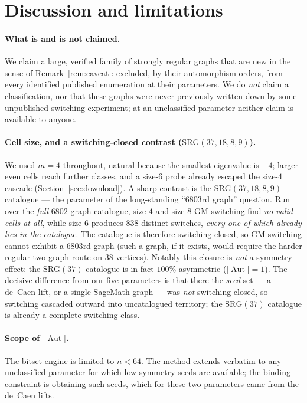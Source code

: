 \documentclass[11pt]{article}
\theoremstyle{definition}
\newcommand{\SRG}[1]{\mathrm{SRG}(#1)}
\newcommand{\Aut}{\operatorname{Aut}}
\begin{document}
\section{Discussion and limitations}\label{sec:discussion}

\paragraph{What is and is not claimed.} We claim a large, verified family of strongly
regular graphs that are new in the sense of Remark~\ref{rem:caveat}: excluded, by their
automorphism orders, from every identified published enumeration at their parameters. We do
\emph{not} claim a classification, nor that these graphs were never previously written
down by some unpublished switching experiment; at an unclassified parameter neither claim
is available to anyone.

\paragraph{Cell size, and a switching-closed contrast ($\SRG{37,18,8,9}$).} We used $m=4$
throughout, natural because the smallest eigenvalue is $-4$; larger even cells reach further
classes, and a size-$6$ probe already escaped the size-$4$ cascade (Section~\ref{sec:download}).
A sharp contrast is the $\SRG{37,18,8,9}$ catalogue --- the parameter of the long-standing
``$6803$rd graph'' question. Run over the \emph{full} $6802$-graph catalogue, size-$4$ and
size-$8$ GM switching find \emph{no valid cells at all}, while size-$6$ produces $838$ distinct
switches, \emph{every one of which already lies in the catalogue}. The catalogue is therefore
switching-closed, so GM switching cannot exhibit a $6803$rd graph (such a graph, if it exists,
would require the harder regular-two-graph route on $38$ vertices). Notably this closure is
\emph{not} a symmetry effect: the $\SRG{37}$ catalogue is in fact $100\%$ asymmetric
($|\Aut|=1$). The decisive difference from our five parameters is that there the \emph{seed}
set --- a de~Caen lift, or a single SageMath graph --- was \emph{not} switching-closed, so
switching cascaded outward into uncatalogued territory; the $\SRG{37}$ catalogue is already a
complete switching class.

\paragraph{Scope of $|\Aut|$.} The bitset engine is limited to $n<64$. The method extends
verbatim to any unclassified parameter for which low-symmetry seeds are available; the
binding constraint is obtaining such seeds, which for these two parameters came from the
de~Caen lifts.
\end{document}
